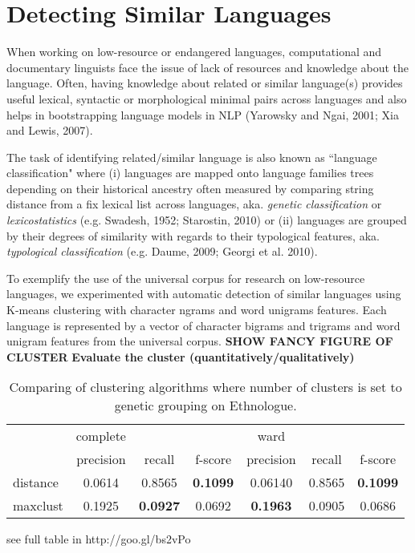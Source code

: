 \section{Detecting Similar Languages} \label{sec:cluster}

When working on low-resource or endangered languages, computational and documentary linguists face the issue of lack of resources and knowledge about the language. Often, having knowledge about related or similar language(s) provides useful lexical, syntactic or morphological minimal pairs across languages and also helps in bootstrapping language models in NLP (Yarowsky
and Ngai, 2001; Xia and Lewis, 2007). 

The task of identifying related/similar language is also known as ``language classification" where (i) languages are mapped onto language families trees depending on their historical ancestry often measured by comparing string distance from a fix lexical list across languages, aka. \emph{genetic classification} or \emph{lexicostatistics} (e.g. Swadesh, 1952; Starostin, 2010) or (ii) languages are grouped by their degrees of similarity with regards to their typological features, aka. \emph{typological classification} (e.g. Daume, 2009; Georgi et al. 2010).

To exemplify the use of the universal corpus for research on low-resource languages, we experimented with automatic detection of similar languages using K-means clustering with character ngrams and word unigrams features. Each language is represented by a vector of character bigrams and trigrams and word unigram features from the universal corpus. 
\newline \newline
\noindent \textbf{SHOW FANCY FIGURE OF CLUSTER}
\newline \newline
\textbf{Evaluate the cluster (quantitatively/qualitatively)}


\begin{table*}[h!]
\begin{centering}

    \begin{tabular}{l|ccc|ccc}
    ~        & complete & ~       & ~       & ward    & ~       & ~       \\ \cline{2-7}
    ~        & precision & recall       & f-score       & precision    & recall       & f-score      \\ \hline
    distance & 0.0614   & 0.8565 & \textbf{0.1099} & 0.06140  & 0.8565 & \textbf{0.1099} \\
    maxclust & 0.1925  & \textbf{0.0927} & 0.0692 & \textbf{0.1963} & 0.0905 & 0.0686  \\
    \end{tabular}
\caption{Comparing of clustering algorithms where number of clusters is set to genetic grouping on Ethnologue.}
\end{centering}
\end{table*}

\noindent
see full table in http://goo.gl/bs2vPo

